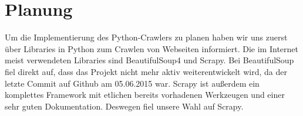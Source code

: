 \chapter{Planung}

Um die Implementierung des Python-Crawlers zu planen haben wir uns zuerst über Libraries in Python zum Crawlen von Webseiten
informiert. Die im Internet meist verwendeten Libraries sind \cite{beautifulsoup} BeautifulSoup4
und \cite{scrapy} Scrapy. Bei BeautifulSoup fiel direkt auf, dass das Projekt nicht mehr aktiv weiterentwickelt wird,
da der letzte Commit auf Github am 05.06.2015 war. Scrapy ist außerdem ein komplettes Framework mit etlichen bereits vorhadenen
Werkzeugen und einer sehr guten Dokumentation. Deswegen fiel unsere Wahl auf Scrapy.